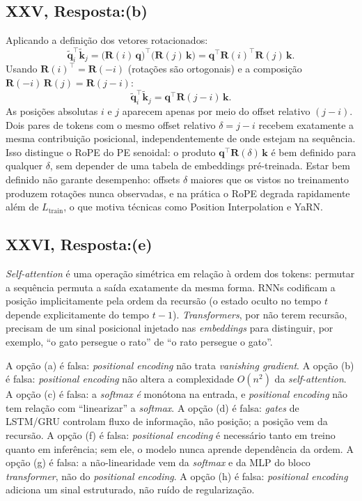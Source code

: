 \documentclass{dlproblemset}
\begin{document}
\subsection*{XXV, Resposta:(b)}
Aplicando a definição dos vetores rotacionados:
\[
  \tilde{\mathbf{q}}_i^\top \tilde{\mathbf{k}}_j
  = \bigl(\mathbf{R}(i)\,\mathbf{q}\bigr)^\top\bigl(\mathbf{R}(j)\,\mathbf{k}\bigr)
  = \mathbf{q}^\top \mathbf{R}(i)^\top \mathbf{R}(j)\,\mathbf{k}.
\]
Usando $\mathbf{R}(i)^\top = \mathbf{R}(-i)$ (rotações são ortogonais) e a
composição $\mathbf{R}(-i)\,\mathbf{R}(j) = \mathbf{R}(j-i)$:
\[
  \tilde{\mathbf{q}}_i^\top \tilde{\mathbf{k}}_j
  = \mathbf{q}^\top \mathbf{R}(j-i)\,\mathbf{k}.
\]
As posições absolutas $i$ e $j$ aparecem apenas por meio do offset relativo $(j-i)$.
Dois pares de tokens com o mesmo offset relativo $\delta = j - i$ recebem
exatamente a mesma contribuição posicional, independentemente de onde estejam na
sequência. Isso distingue o RoPE do PE senoidal: o produto
$\mathbf{q}^\top \mathbf{R}(\delta)\,\mathbf{k}$ é bem definido para qualquer $\delta$, sem
depender de uma tabela de embeddings pré-treinada. Estar bem definido não garante
desempenho: offsets $\delta$ maiores que os vistos no treinamento produzem rotações nunca
observadas, e na prática o RoPE degrada rapidamente além de $L_{\mathrm{train}}$, o que
motiva técnicas como Position Interpolation e YaRN.

\subsection*{XXVI, Resposta:(e)}
\textit{Self-attention} é uma operação simétrica em relação à ordem dos tokens: permutar
a sequência permuta a saída exatamente da mesma forma. RNNs codificam a posição
implicitamente pela ordem da recursão (o estado oculto no tempo $t$ depende
explicitamente do tempo $t-1$). \textit{Transformers}, por não terem recursão, precisam
de um sinal posicional injetado nas \textit{embeddings} para distinguir, por exemplo,
``o gato persegue o rato'' de ``o rato persegue o gato''.

A opção (a) é falsa: \textit{positional encoding} não trata \textit{vanishing gradient}.
A opção (b) é falsa: \textit{positional encoding} não altera a complexidade $O(n^2)$ da
\textit{self-attention}. A opção (c) é falsa: a \textit{softmax} \emph{é} monótona na
entrada, e \textit{positional encoding} não tem relação com ``linearizar'' a
\textit{softmax}. A opção (d) é falsa: \textit{gates} de LSTM/GRU controlam fluxo de
informação, não posição; a posição vem da recursão. A opção (f) é falsa:
\textit{positional encoding} é necessário tanto em treino quanto em inferência; sem
ele, o modelo nunca aprende dependência da ordem. A opção (g) é falsa: a
não-linearidade vem da \textit{softmax} e da MLP do bloco \textit{transformer}, não do
\textit{positional encoding}. A opção (h) é falsa: \textit{positional encoding}
adiciona um sinal estruturado, não ruído de regularização.
\end{document}
